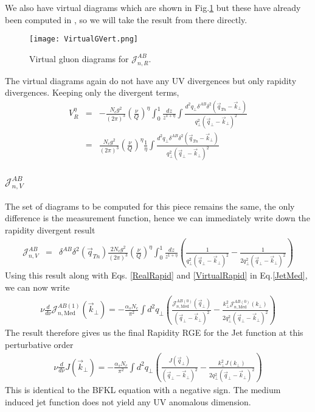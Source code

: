 \documentclass[letter,11pt]{article}
\newcommand{\nn}{\nonumber}
\newcommand{\bea}{\begin{eqnarray}}
\newcommand{\eea}{\end{eqnarray}}
\def\nn{\nonumber}
\begin{document}
We also have virtual diagrams which are shown in Fig.\ref{Virtual} but these have already been computed in \cite{Rothstein:2016bsq}, so we will take the result from there directly. 
\begin{figure}
  \texttt{[image: VirtualGVert.png]}
  \caption{Virtual gluon diagrams for $\mathcal{J}^{AB}_{n,R}$.}
  \label{Virtual}
\end{figure}

The virtual diagrams again do not have any UV divergences but only rapidity divergences.  Keeping only the divergent terms, 
\bea
 V_R^{\eta}&=& -\frac{N_cg^2}{(2\pi)^3}\left(\frac{\nu}{Q}\right)^{\eta}\int_0^{1}\frac{dz}{z^{1+\eta}}\int \frac{d^2q_{\perp}\delta^{AB}\delta^2(\vec{q}_{Tn}-\vec{k}_{\perp})}{q_{\perp}^2(\vec{q}_{\perp}-\vec{k}_{\perp})^2}\nn\\
&=&  \frac{N_cg^2}{(2\pi)^3}\left(\frac{\nu}{Q}\right)^{\eta}\frac{1}{\eta}\int \frac{d^2q_{\perp}\delta^{AB}\delta^2(\vec{q}_{Tn}-\vec{k}_{\perp})}{q_{\perp}^2(\vec{q}_{\perp}-\vec{k}_{\perp})^2}
\label{VirtualRapid}
\eea


\subsubsection{$\mathcal{J}_{n,V}^{AB}$}
The set of diagrams to be computed for this piece remains the same, the only difference is the measurement function, hence we can immediately write down the rapidity divergent result 
\bea
\mathcal{J}_{n,V}^{AB}&=&  \delta^{AB}\delta^2(\vec{q}_{Tn})\frac{2N_cg^2}{(2\pi)^3}\left(\frac{\nu}{Q}\right)^{\eta}\int_0^{1}\frac{dz}{z^{1+\eta}}\left(\frac{1}{q_{\perp}^2(\vec{q}_{\perp}-\vec{k}_{\perp})^2}-\frac{1}{2q_{\perp}^2(\vec{q}_{\perp}-\vec{k}_{\perp})^2}\right)
\eea
Using this result along with Eqs. \ref{RealRapid} and \ref{VirtualRapid} in  Eq.\ref{JetMed}, we can now write 
\bea
 \nu\frac{d}{d\nu} \mathcal{J}_{n,\text{Med}}^{AB(1)}(\vec{k}_{\perp})= -\frac{\alpha_sN_c}{\pi^2}\int d^2q_{\perp} \left( \frac{\mathcal{J}_{n,\text{Med}}^{AB(0)}(\vec{q}_{\perp})}{(\vec{q}_{\perp}-\vec{k}_{\perp})^2} -\frac{k_{\perp}^2\mathcal{J}_{n,\text{Med}}^{AB(0)}(k_{\perp})}{2q_{\perp}^2(\vec{q}_{\perp}-\vec{k}_{\perp})^2}\right)
\eea
The result therefore gives us the final Rapidity RGE for the Jet function at this perturbative order
 \bea
\nu\frac{d}{d\nu} J(\vec{k}_{\perp})= -\frac{\alpha_sN_c}{\pi^2}\int d^2q_{\perp} \left( \frac{J(\vec{q}_{\perp})}{(\vec{q}_{\perp}-\vec{k}_{\perp})^2} -\frac{k_{\perp}^2J(k_{\perp})}{2q_{\perp}^2(\vec{q}_{\perp}-\vec{k}_{\perp})^2}\right)
\eea
This is identical to the BFKL equation with a negative sign. The medium induced jet function does not yield any UV anomalous dimension.
\end{document}
